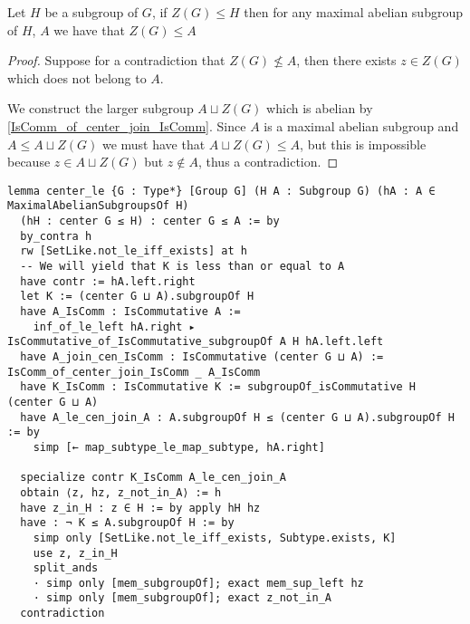 \begin{lemma}
  \label{MaximalAbelianSubgroup.center_le}
  Let $H$ be a subgroup of $G$, if $Z(G) \le H$ then for any maximal abelian subgroup of $H$, $A$ we have that $Z(G) \le A$ 
  \leanok
\end{lemma}
\begin{proof}
  \leanok

  Suppose for a contradiction that $Z(G) \not\le A$, then there exists $z \in Z(G)$ which does not belong to $A$.

  We construct the larger subgroup $A \sqcup Z(G)$ which is abelian by \ref{IsComm_of_center_join_IsComm}. Since 
  $A$ is a maximal abelian subgroup and $A \le A \sqcup Z(G)$ we must have that $A \sqcup Z(G) \le A$, but this is impossible 
  because $z \in A \sqcup Z(G)$ but $z \notin A$, thus a contradiction.
\end{proof}
\begin{footnotesize}
\begin{verbatim}
lemma center_le {G : Type*} [Group G] (H A : Subgroup G) (hA : A ∈ MaximalAbelianSubgroupsOf H)
  (hH : center G ≤ H) : center G ≤ A := by
  by_contra h
  rw [SetLike.not_le_iff_exists] at h
  -- We will yield that K is less than or equal to A
  have contr := hA.left.right
  let K := (center G ⊔ A).subgroupOf H
  have A_IsComm : IsCommutative A :=
    inf_of_le_left hA.right ▸ IsCommutative_of_IsCommutative_subgroupOf A H hA.left.left
  have A_join_cen_IsComm : IsCommutative (center G ⊔ A) := IsComm_of_center_join_IsComm _ A_IsComm
  have K_IsComm : IsCommutative K := subgroupOf_isCommutative H (center G ⊔ A)
  have A_le_cen_join_A : A.subgroupOf H ≤ (center G ⊔ A).subgroupOf H := by
    simp [← map_subtype_le_map_subtype, hA.right]

  specialize contr K_IsComm A_le_cen_join_A
  obtain ⟨z, hz, z_not_in_A⟩ := h
  have z_in_H : z ∈ H := by apply hH hz
  have : ¬ K ≤ A.subgroupOf H := by
    simp only [SetLike.not_le_iff_exists, Subtype.exists, K]
    use z, z_in_H
    split_ands
    · simp only [mem_subgroupOf]; exact mem_sup_left hz
    · simp only [mem_subgroupOf]; exact z_not_in_A
  contradiction
\end{verbatim}
\end{footnotesize}

